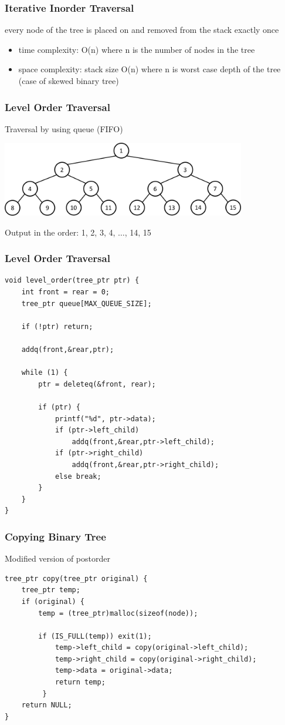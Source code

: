 \documentclass[newPxFont,sthlmFooter,nooffset]{beamer}
\begin{document}
\begin{frame}[t]
  \frametitle{Iterative Inorder Traversal}
every node of the tree is placed on and removed from the stack exactly once

\begin{itemize}
\item time complexity: O(n) where n is the number of nodes in the tree
\item space complexity: stack size O(n) where n is worst case depth of the
  tree (case of skewed binary tree)
\end{itemize}

\end{frame}


\begin{frame}[t]
  \frametitle{Level Order Traversal}
Traversal by using queue (FIFO)

  \begin{center}
    \includegraphics[width=0.8\textwidth]{figures/fig11_level_order.png}
  \end{center}

Output in the order: 1, 2, 3, 4, $\ldots$, 14, 15
\end{frame}


\begin{frame}[t, fragile]
  \frametitle{Level Order Traversal}
  \begin{lstlisting}
void level_order(tree_ptr ptr) { 
    int front = rear = 0;
    tree_ptr queue[MAX_QUEUE_SIZE]; 

    if (!ptr) return; 

    addq(front,&rear,ptr);

    while (1) {
        ptr = deleteq(&front, rear); 

        if (ptr) {
            printf("%d", ptr->data); 
            if (ptr->left_child)
                addq(front,&rear,ptr->left_child); 
            if (ptr->right_child)
                addq(front,&rear,ptr->right_child); 
            else break;
        }
    } 
}    
  \end{lstlisting}
\end{frame}


\begin{frame}[t, fragile]
  \frametitle{Copying Binary Tree}
Modified version of postorder
\begin{lstlisting}
tree_ptr copy(tree_ptr original) {
    tree_ptr temp; 
    if (original) {
        temp = (tree_ptr)malloc(sizeof(node)); 

        if (IS_FULL(temp)) exit(1); 
            temp->left_child = copy(original->left_child); 
            temp->right_child = copy(original->right_child); 
            temp->data = original->data; 
            return temp;
         }
    return NULL; 
}  
\end{lstlisting}
\end{frame}
\end{document}
